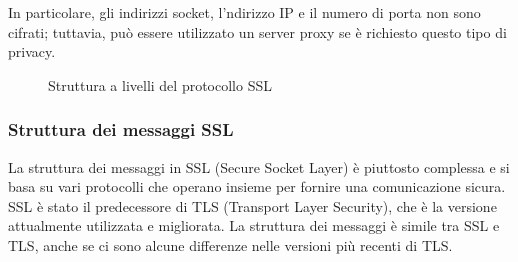 \documentclass{article}
\theoremstyle{definition}
\begin{document}
In particolare, gli indirizzi socket, l'ndirizzo IP e il numero di porta non sono cifrati; tuttavia, può essere utilizzato un server proxy se è richiesto questo tipo di privacy.

\begin{figure}[htbp]
\centering
{}
\caption{Struttura a livelli del protocollo SSL}
\end{figure}

\subsubsection{Struttura dei messaggi SSL}
La struttura dei messaggi in SSL (Secure Socket Layer) è piuttosto complessa e si basa su vari protocolli che operano insieme per fornire una comunicazione sicura. SSL è stato il predecessore di TLS (Transport Layer Security), che è la versione attualmente utilizzata e migliorata. La struttura dei messaggi è simile tra SSL e TLS, anche se ci sono alcune differenze nelle versioni più recenti di TLS.
\end{document}
